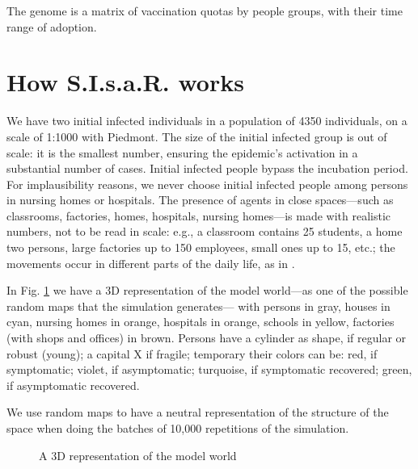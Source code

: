 \documentclass[graybox]{svmult}
\begin{document}
The genome is a matrix of vaccination quotas by people groups, with their time range of adoption. 


\section{How S.I.s.a.R. works}
\label{howWorks}

We have two initial infected individuals in a population of 4350 individuals, on a scale of 1:1000 with Piedmont. The size of the initial infected group is out of scale: it is the smallest number, ensuring the epidemic's activation in a substantial number of cases. Initial infected people bypass the incubation period. For implausibility reasons, we never choose initial infected people among persons in nursing homes or hospitals. The presence of agents in close spaces---such as classrooms, factories, homes, hospitals, nursing homes---is made with realistic numbers, not to be read in scale: e.g., a classroom contains 25 students, a home two persons, large factories up to 150 employees, small ones up to 15, etc.; the movements occur in different parts of the daily life, as in \cite{ghorbani2020assocc}.

In Fig. \ref{3D} we have a 3D representation of the model world---as one of the possible random maps that the simulation generates--- with persons in gray, houses in cyan, nursing homes in orange, hospitals in orange, schools in yellow, factories (with shops and offices) in brown. Persons have a cylinder as shape, if regular or robust (young); a capital X if fragile; temporary their colors can be: red, if symptomatic; violet, if asymptomatic; turquoise, if symptomatic recovered; green, if asymptomatic recovered.

We use random maps to have a neutral representation of the structure of the space when doing the batches of 10,000 repetitions of the simulation. 

\begin{figure}[t]
\center
{}
\caption{A 3D representation of the model world}
\label{3D}
\end{figure}
\end{document}
